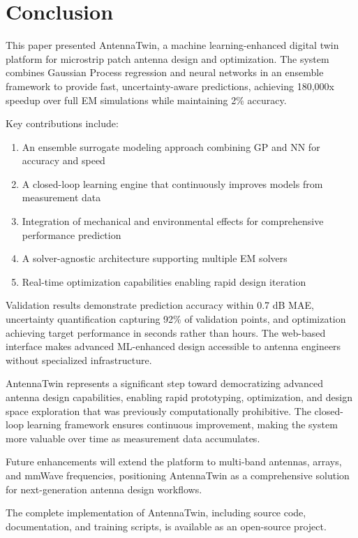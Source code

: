 \documentclass[conference]{IEEEtran}
\begin{document}
\section{Conclusion}
This paper presented AntennaTwin, a machine learning-enhanced digital twin platform for microstrip patch antenna design and optimization. The system combines Gaussian Process regression and neural networks in an ensemble framework to provide fast, uncertainty-aware predictions, achieving 180,000x speedup over full EM simulations while maintaining 2\% accuracy.

Key contributions include:
\begin{enumerate}
    \item An ensemble surrogate modeling approach combining GP and NN for accuracy and speed
    \item A closed-loop learning engine that continuously improves models from measurement data
    \item Integration of mechanical and environmental effects for comprehensive performance prediction
    \item A solver-agnostic architecture supporting multiple EM solvers
    \item Real-time optimization capabilities enabling rapid design iteration
\end{enumerate}

Validation results demonstrate prediction accuracy within 0.7 dB MAE, uncertainty quantification capturing 92\% of validation points, and optimization achieving target performance in seconds rather than hours. The web-based interface makes advanced ML-enhanced design accessible to antenna engineers without specialized infrastructure.

AntennaTwin represents a significant step toward democratizing advanced antenna design capabilities, enabling rapid prototyping, optimization, and design space exploration that was previously computationally prohibitive. The closed-loop learning framework ensures continuous improvement, making the system more valuable over time as measurement data accumulates.

Future enhancements will extend the platform to multi-band antennas, arrays, and mmWave frequencies, positioning AntennaTwin as a comprehensive solution for next-generation antenna design workflows.

The complete implementation of AntennaTwin, including source code, documentation, and training scripts, is available as an open-source project.
\end{document}
